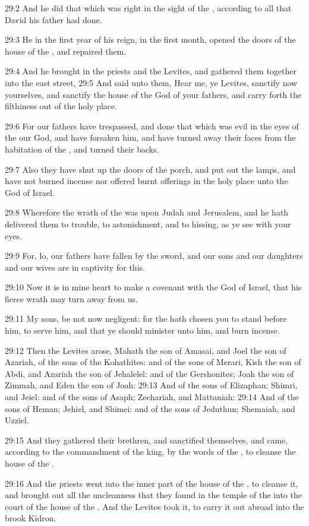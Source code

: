 29:2 And he did that which was right in the sight of the \LORD, according to all that David his father had done.

29:3 He in the first year of his reign, in the first month, opened the doors of the house of the \LORD, and repaired them.

29:4 And he brought in the priests and the Levites, and gathered them together into the east street, 29:5 And said unto them, Hear me, ye Levites, sanctify now yourselves, and sanctify the house of the \LORD God of your fathers, and carry forth the filthiness out of the holy place.

29:6 For our fathers have trespassed, and done that which was evil in the eyes of the \LORD our God, and have forsaken him, and have turned away their faces from the habitation of the \LORD, and turned their backs.

29:7 Also they have shut up the doors of the porch, and put out the lamps, and have not burned incense nor offered burnt offerings in the holy place unto the God of Israel.

29:8 Wherefore the wrath of the \LORD was upon Judah and Jerusalem, and he hath delivered them to trouble, to astonishment, and to hissing, as ye see with your eyes.

29:9 For, lo, our fathers have fallen by the sword, and our sons and our daughters and our wives are in captivity for this.

29:10 Now it is in mine heart to make a covenant with the \LORD God of Israel, that his fierce wrath may turn away from us.

29:11 My sons, be not now negligent: for the \LORD hath chosen you to stand before him, to serve him, and that ye should minister unto him, and burn incense.

29:12 Then the Levites arose, Mahath the son of Amasai, and Joel the son of Azariah, of the sons of the Kohathites: and of the sons of Merari, Kish the son of Abdi, and Azariah the son of Jehalelel: and of the Gershonites; Joah the son of Zimmah, and Eden the son of Joah: 29:13 And of the sons of Elizaphan; Shimri, and Jeiel: and of the sons of Asaph; Zechariah, and Mattaniah: 29:14 And of the sons of Heman; Jehiel, and Shimei: and of the sons of Jeduthun; Shemaiah, and Uzziel.

29:15 And they gathered their brethren, and sanctified themselves, and came, according to the commandment of the king, by the words of the \LORD, to cleanse the house of the \LORD.

29:16 And the priests went into the inner part of the house of the \LORD, to cleanse it, and brought out all the uncleanness that they found in the temple of the \LORD into the court of the house of the \LORD. And the Levites took it, to carry it out abroad into the brook Kidron.

